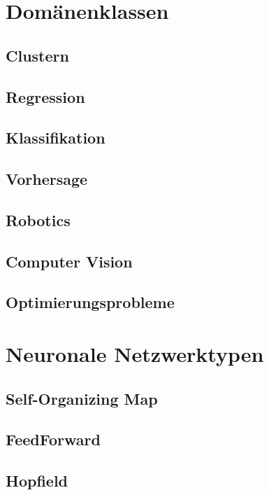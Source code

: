 \section{Domänenklassen}

\subsection{Clustern}

\subsection{Regression}

\subsection{Klassifikation}

\subsection{Vorhersage}

\subsection{Robotics}

\subsection{Computer Vision}

\subsection{Optimierungsprobleme}

\cite{AI3}

\section{Neuronale Netzwerktypen}

\subsection{Self-Organizing Map}

\subsection{FeedForward}

\subsection{Hopfield}

